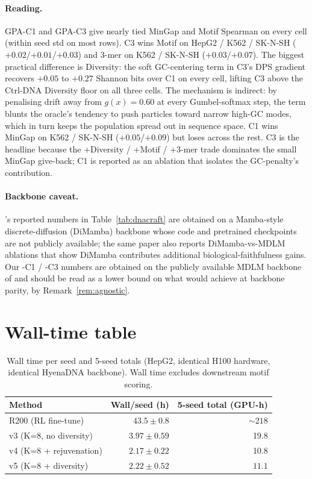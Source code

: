 \paragraph{Reading.}
GPA-C1 and GPA-C3 give nearly tied MinGap and Motif Spearman on every cell (within seed std on most rows). C3 wins Motif on HepG2 / K562 / SK-N-SH ($+0.02$/$+0.01$/$+0.03$) and 3-mer on K562 / SK-N-SH ($+0.03$/$+0.07$). The biggest practical difference is Diversity: the soft GC-centering term in C3's DPS gradient recovers $+0.05$ to $+0.27$ Shannon bits over C1 on every cell, lifting C3 above the Ctrl-DNA Diversity floor on all three cells. The mechanism is indirect: by penalising drift away from $g(x)\!=\!0.60$ at every Gumbel-softmax step, the term blunts the oracle's tendency to push particles toward narrow high-GC modes, which in turn keeps the population spread out in sequence space. C1 wins MinGap on K562 / SK-N-SH ($+0.05$/$+0.09$) but loses across the rest. C3 is the headline because the +Diversity / +Motif / +3-mer trade dominates the small MinGap give-back; C1 is reported as an ablation that isolates the GC-penalty's contribution.

\paragraph{Backbone caveat.}
\dnacraft{}'s reported numbers in Table~\ref{tab:dnacraft} are obtained on a Mamba-style discrete-diffusion (DiMamba) backbone whose code and pretrained checkpoints are not publicly available; the same paper also reports DiMamba-vs-MDLM ablations that show DiMamba contributes additional biological-faithfulness gains. Our \gpa{}-C1 / \gpa{}-C3 numbers are obtained on the publicly available MDLM backbone of \citet{sahoo2024mdlm} and should be read as a lower bound on what \gpa{} would achieve at backbone parity, by Remark~\ref{rem:agnostic}.

\section{Wall-time table}\label{app:wall}

\begin{table}[h]
\caption{Wall time per seed and 5-seed totals (HepG2, identical H100 hardware, identical HyenaDNA backbone). Wall time excludes downstream motif scoring.}
\label{tab:wall}
\centering
\small
\begin{tabular}{lrr}
\toprule
Method & Wall/seed (h) & 5-seed total (GPU-h) \\
\midrule
\ctrldna{} R200 (RL fine-tune) & $43.5\pm 0.8$ & $\sim\!218$ \\
\gpa{} v3 (K=8, no diversity)  & $3.97\pm 0.59$ & 19.8 \\
\gpa{} v4 (K=8 + rejuvenation) & $2.17\pm 0.22$ & 10.8 \\
\gpa{} v5 (K=8 + diversity)    & $\mathbf{2.22\pm 0.52}$ & $\mathbf{11.1}$ \\
\bottomrule
\end{tabular}
\end{table}

